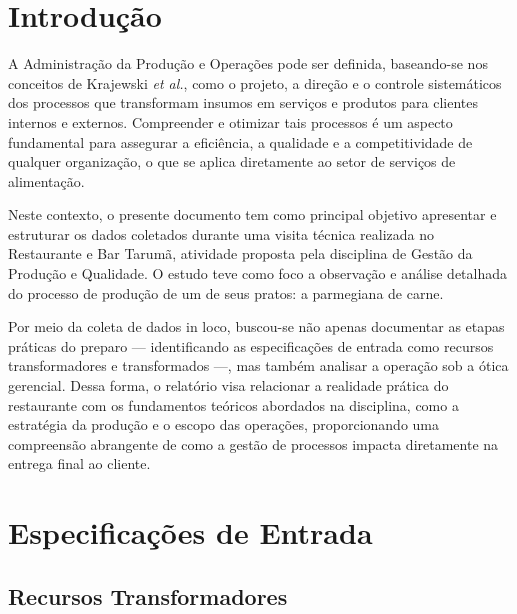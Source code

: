 \documentclass[12pt, a4paper]{article}
\begin{document}
\tableofcontents
\newpage

\section{Introdução}

A Administração da Produção e Operações pode ser definida, baseando-se nos conceitos de Krajewski \textit{et al.}, como o projeto, a direção e o controle sistemáticos dos processos que transformam insumos em serviços e produtos para clientes internos e externos. Compreender e otimizar tais processos é um aspecto fundamental para assegurar a eficiência, a qualidade e a competitividade de qualquer organização, o que se aplica diretamente ao setor de serviços de alimentação.

Neste contexto, o presente documento tem como principal objetivo apresentar e estruturar os dados coletados durante uma visita técnica realizada no Restaurante e Bar Tarumã, atividade proposta pela disciplina de Gestão da Produção e Qualidade. O estudo teve como foco a observação e análise detalhada do processo de produção de um de seus pratos: a parmegiana de carne.

Por meio da coleta de dados in loco, buscou-se não apenas documentar as etapas práticas do preparo — identificando as especificações de entrada como recursos transformadores e transformados —, mas também analisar a operação sob a ótica gerencial. Dessa forma, o relatório visa relacionar a realidade prática do restaurante com os fundamentos teóricos abordados na disciplina, como a estratégia da produção e o escopo das operações, proporcionando uma compreensão abrangente de como a gestão de processos impacta diretamente na entrega final ao cliente.

\section{Especificações de Entrada}

\subsection{Recursos Transformadores}
\end{document}
